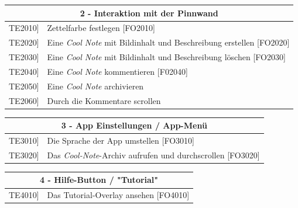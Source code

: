 \documentclass[a4paper]{scrreprt}
\begin{document}
	    \vspace{5mm}
	    
	    \begin{table}[h!]
	    	\centering
	    	\label{my-label}
	    	\begin{tabular}{p{2cm}p{12cm}}
	    		
	    		\multicolumn{2}{c}{\textbf{2 - Interaktion mit der Pinnwand}} \\ \hline
	    		\centering{[}TE2010{]} & Zettelfarbe festlegen {[}FO2010{]}\\
	    		\centering{[}TE2020{]}& Eine \textit{Cool Note}  mit Bildinhalt und Beschreibung erstellen {[}FO2020{]}                             \\
	    		\centering{[}TE2030{]}& Eine \textit{Cool Note} mit Bildinhalt und Beschreibung löschen {[}FO2030{]}\\ 
	    		\centering{[}TE2040{]}& Eine \textit{Cool Note} kommentieren {[}F02040{]}  \\ 
	    		\centering{[}TE2050{]}& Eine \textit{Cool Note} archivieren\\ 
	    		\centering{[}TE2060{]}& Durch die Kommentare scrollen\\ 
	    		\hline
	    	\end{tabular}
	    \end{table}
	    
	    \vspace{5mm}
	    
	    \begin{table}[h!]
	    	\centering
	    	\label{my-label}
	    	\begin{tabular}{p{2cm}p{12cm}}
	    		
	    		\multicolumn{2}{c}{\textbf{3 - App Einstellungen / App-Menü}} \\ \hline
	    		\centering{[}TE3010{]} & Die Sprache der App umstellen {[}FO3010{]}\\
	    		\centering{[}TE3020{]} & Das \textit{Cool-Note}-Archiv aufrufen und durchscrollen {[}FO3020{]}\\
	    		\hline
	    	\end{tabular}
	    \end{table}
	    
	    \vspace{5mm}
	    
	    \begin{table}[h!]
	    	\centering
	    	\label{my-label}
	    	\begin{tabular}{p{2cm}p{12cm}}
	    		
	    		\multicolumn{2}{c}{\textbf{4 - Hilfe-Button / "Tutorial"}} \\ \hline
	    		\centering{[}TE4010{]} & Das Tutorial-Overlay ansehen {[}FO4010{]}\\    				
	    		\hline
	    	\end{tabular}
	    \end{table}
	    
\end{document}

